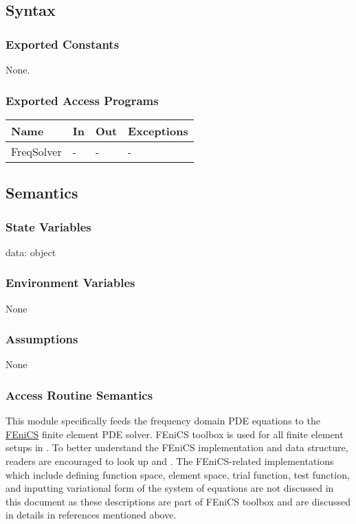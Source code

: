 \documentclass[12pt, titlepage]{article}
\begin{document}
\subsection{Syntax}

\subsubsection{Exported Constants}
None.
\subsubsection{Exported Access Programs}

\begin{center}
	\begin{tabular}{p{2cm} p{4cm} p{4cm} p{2cm}}
		\hline
		\textbf{Name} & \textbf{In} & \textbf{Out} & \textbf{Exceptions} \\
		\hline
		FreqSolver & - & - & - \\
		\hline
	\end{tabular}
\end{center}

\subsection{Semantics}

\subsubsection{State Variables}

data: object
	
\subsubsection{Environment Variables}

None

\subsubsection{Assumptions}

None

\subsubsection{Access Routine Semantics}

This module specifically feeds the frequency domain PDE equations to the \hyperref{https://fenicsproject.org/}{}{}{FEniCS} finite element PDE solver. FEniCS toolbox is used for all finite element setups in \progname{}. To better understand the  FEniCS implementation and data structure, readers are encouraged to look up \cite{alnaes2015fenics} and \cite{logg2012finite}. The FEniCS-related implementations which include defining function space, element space, trial function, test function, and inputting variational form of the system of equations are not discussed in this document as these descriptions are part of FEniCS toolbox and are discussed in details in references mentioned above. 
\end{document}

